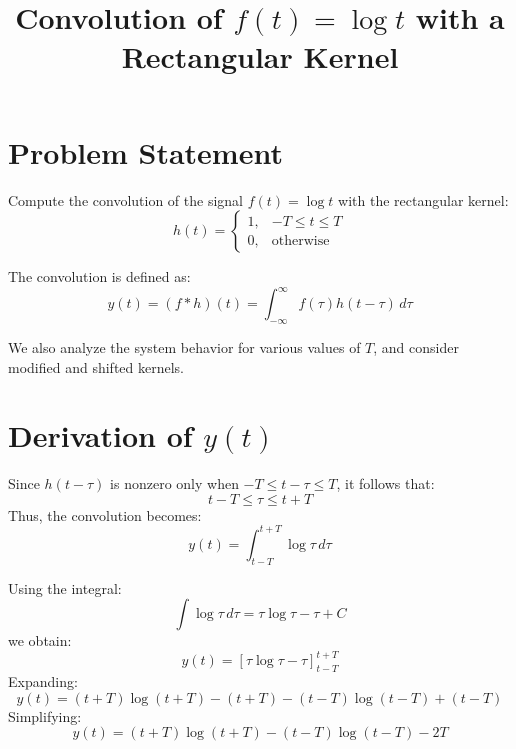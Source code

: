 \documentclass{article}
\title{Convolution of \( f(t) = \log t \) with a Rectangular Kernel}
\begin{document}
\maketitle

\section{Problem Statement}

Compute the convolution of the signal \( f(t) = \log t \) with the rectangular kernel:
\[
h(t) =
\begin{cases}
1, & -T \leq t \leq T \\
0, & \text{otherwise}
\end{cases}
\]

The convolution is defined as:
\[
y(t) = (f * h)(t) = \int_{-\infty}^{\infty} f(\tau) h(t-\tau) \, d\tau
\]

We also analyze the system behavior for various values of \( T \), and consider modified and shifted kernels.

\section*{Derivation of \( y(t) \)}

Since \( h(t-\tau) \) is nonzero only when \( -T \leq t-\tau \leq T \), it follows that:
\[
t-T \leq \tau \leq t+T
\]
Thus, the convolution becomes:
\[
y(t) = \int_{t-T}^{t+T} \log \tau \, d\tau
\]

Using the integral:
\[
\int \log \tau \, d\tau = \tau \log \tau - \tau + C
\]
we obtain:
\[
y(t) = \left[ \tau \log \tau - \tau \right]_{t-T}^{t+T}
\]
Expanding:
\[
y(t) = (t+T)\log(t+T) - (t+T) - (t-T)\log(t-T) + (t-T)
\]
Simplifying:
\[
\boxed{y(t) = (t+T)\log(t+T) - (t-T)\log(t-T) - 2T}
\]
\newpage
\end{document}
